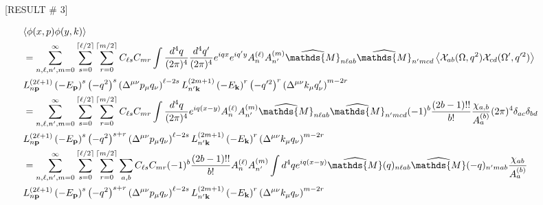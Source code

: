 \documentclass[aps,prd,preprint,nofootinbib,amsmath,amssymb,showpacs,longbibliography,singlecolumn,superscriptaddress,10pt]{revtex4-1}
\theoremstyle{plain}
\theoremstyle{definition}
\begin{document}
[RESULT \# 3]

\begin{equation}
\hspace{-1.5cm}
\begin{aligned}
&
\langle \phi(x,p) \phi(y,k)  \rangle 
\\
&
=
\sum_{n,\ell, n',m = 0}^{\infty} \sum_{s=0}^{\lceil \ell / 2 \rceil} \sum_{r=0}^{\lceil m / 2 \rceil} C_{\ell s}
 C_{m r}
\int \frac{d^{4}q}{(2 \pi)^{4}}  \frac{d^{4}q'}{(2 \pi)^{4}} e^{iqx} e^{iq'y} A_{n}^{(\ell)} A_{n'}^{(m)}\widehat{\mathds{M}}_{n \ell ab} \widehat{\mathds{M}}_{n' m c d} \left\langle \mathcal{X}_{ab}(\Omega, q^{2})
\mathcal{X}_{cd}(\Omega', q'^{2})\right\rangle \\
&
L^{(2 \ell + 1)}_{n {\bf p}}  \left(-E_{\bf p}\right)^{s} \left(-q^{2}\right)^{s} 
\left(\Delta^{\mu \nu} p_{\mu} q_{\nu}\right)^{\ell - 2s}
L^{(2 m + 1)}_{n' {\bf k}} \left(-E_{\bf k}\right)^{r} \left(-q'^{2}\right)^{r}
\left(\Delta^{\mu \nu} k_{\mu} q'_{\nu}\right)^{m - 2r}
\\
&
=
\sum_{n,\ell, n',m = 0}^{\infty} \sum_{s=0}^{\lceil \ell / 2 \rceil} \sum_{r=0}^{\lceil m / 2 \rceil} C_{\ell s}
 C_{m r}
\int \frac{d^{4}q}{(2 \pi)^{4}} e^{iq(x-y)} A_{n}^{(\ell)} A_{n'}^{(m)} \widehat{\mathds{M}}_{n \ell a b} \widehat{\mathds{M}}_{n' m c d} 
(-1)^{b}\frac{(2 b - 1)!!}{b!}
\frac{\chi_{a,b}}{A_{a}^{(b)}} (2 \pi)^{4}  \delta_{a c} \delta_{b d}
\\
&
L^{(2 \ell + 1)}_{n {\bf p}}  \left(-E_{\bf p}\right)^{s} \left(-q^{2}\right)^{s+r} 
\left(\Delta^{\mu \nu} p_{\mu} q_{\nu}\right)^{\ell - 2s}
L^{(2 m + 1)}_{n' {\bf k}} \left(-E_{\bf k}\right)^{r} 
\left(\Delta^{\mu \nu} k_{\mu} q_{\nu}\right)^{m - 2r}
\\
&
=
\sum_{n,\ell, n',m = 0}^{\infty} \sum_{s=0}^{\lceil \ell / 2 \rceil} \sum_{r=0}^{\lceil m / 2 \rceil} \sum_{a,b} C_{\ell s}
 C_{m r} (-1)^{b}\frac{(2 b - 1)!!}{b!} A_{n}^{(\ell)} A_{n'}^{(m)}
\int d^{4}q e^{iq(x-y)}  \widehat{\mathds{M}}(q)_{n \ell a b} \widehat{\mathds{M}}(-q)_{n' m a b} 
\frac{\chi_{ab}}{A_{a}^{(b)}}   \\
&
L^{(2 \ell + 1)}_{n {\bf p}}  \left(-E_{\bf p}\right)^{s} \left(-q^{2}\right)^{s+r} 
\left(\Delta^{\mu \nu} p_{\mu} q_{\nu}\right)^{\ell - 2s}
L^{(2 m + 1)}_{n' {\bf k}} \left(-E_{\bf k}\right)^{r} 
\left(\Delta^{\mu \nu} k_{\mu} q_{\nu}\right)^{m - 2r}
\end{aligned}    
\end{equation}


\subsection{}
\end{document}
